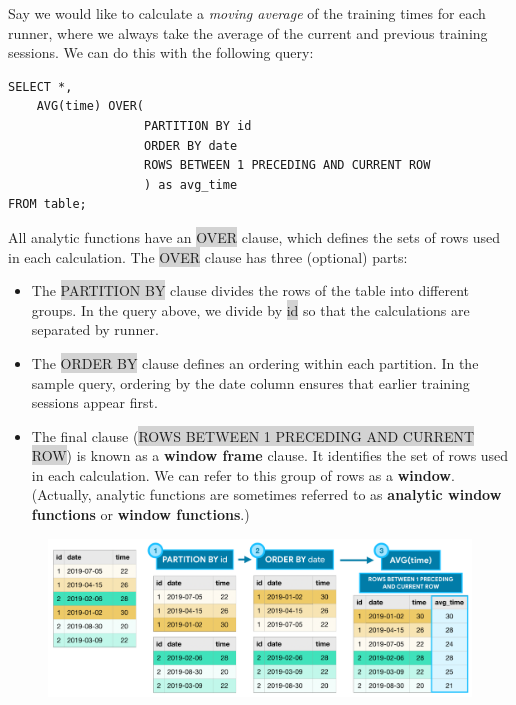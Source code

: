 \documentclass[11pt]{article}
\begin{document}
{{{{{{{{Say we would like to calculate a \textit{moving average} of the training times for each runner, where we always take the average of the current and previous training sessions. We can do this with the following query:
\begin{lstlisting}
SELECT *, 
	AVG(time) OVER(
				   PARTITION BY id 
				   ORDER BY date 
				   ROWS BETWEEN 1 PRECEDING AND CURRENT ROW 
				   ) as avg_time 
FROM table; 
\end{lstlisting}
All analytic functions have an \colorbox{lightgray}{OVER} clause, which defines the sets of rows used in each calculation. The \colorbox{lightgray}{OVER} clause has three (optional) parts:
\begin{itemize}[leftmargin = *]
\item The \colorbox{lightgray}{PARTITION BY} clause divides the rows of the table into different groups. In the query above, we divide by \colorbox{lightgray}{id} so that the calculations are separated by runner.
\item The \colorbox{lightgray}{ORDER BY} clause defines an ordering within each partition. In the sample query, ordering by the date column ensures that earlier training sessions appear first.
\item The final clause (\colorbox{lightgray}{ROWS BETWEEN 1 PRECEDING AND CURRENT ROW}) is known as a \textbf{window frame} clause. It identifies the set of rows used in each calculation. We can refer to this group of rows as a \textbf{window}. (Actually, analytic functions are sometimes referred to as \textbf{analytic window functions} or \textbf{window functions}.)
\end{itemize}
\begin{figure}[H]
\includegraphics[scale = 0.6]{5_1}
\centering
\end{figure}

}}}}}}}}
\end{document}
